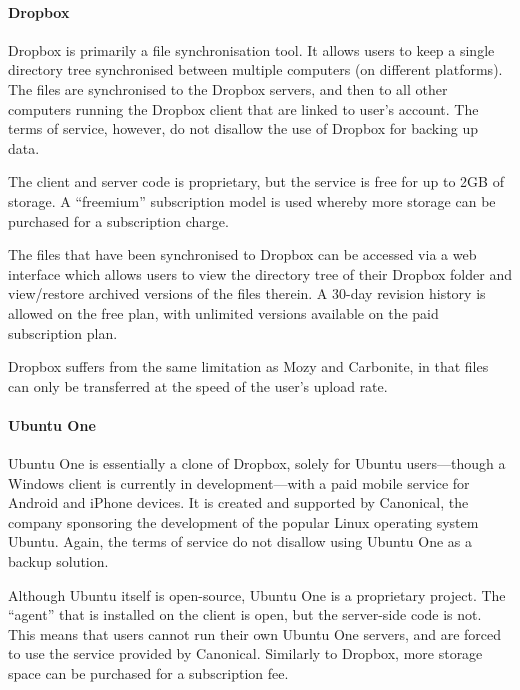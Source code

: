 \begin{bibunit}[plain]
\paragraph{Dropbox}

Dropbox is primarily a file synchronisation tool. It allows users to keep
a single directory tree synchronised between multiple computers (on different
platforms). The files are synchronised to the Dropbox servers, and then to all
other computers running the Dropbox client that are linked to user's
account\cite{Dropbox}.  The terms of service, however, do not disallow the use
of Dropbox for backing up data\cite{Dropbox-terms}.

The client and server code is proprietary, but the service is free for up to
2GB of storage. A ``freemium'' subscription model is used whereby more storage
can be purchased for a subscription charge\cite{Dropbox}.

The files that have been synchronised to Dropbox can be accessed via a web
interface which allows users to view the directory tree of their Dropbox folder
and view/restore archived versions of the files therein. A 30-day revision
history is allowed on the free plan, with unlimited versions available on the
paid subscription plan\cite{Dropbox}.

Dropbox suffers from the same limitation as Mozy and Carbonite, in that files
can only be transferred at the speed of the user's upload rate.

\paragraph{Ubuntu One}

Ubuntu One is essentially a clone of Dropbox, solely for Ubuntu users---though
a Windows client is currently in development---with a paid mobile service for
Android and iPhone devices\cite{UbuntuOne}. It is created and supported by
Canonical, the company sponsoring the development of the popular Linux
operating system Ubuntu\cite{UbuntuOne}. Again, the terms of service do not
disallow using Ubuntu One as a backup solution\cite{UbuntuOne-terms}.

Although Ubuntu itself is open-source, Ubuntu One is a proprietary project. The
``agent'' that is installed on the client is open, but the server-side code is
not\cite{UbuntuOne-servers}. This means that users cannot run their own Ubuntu
One servers, and are forced to use the service provided by Canonical. Similarly
to Dropbox, more storage space can be purchased for a subscription
fee\cite{UbuntuOne}.


\end{bibunit}

